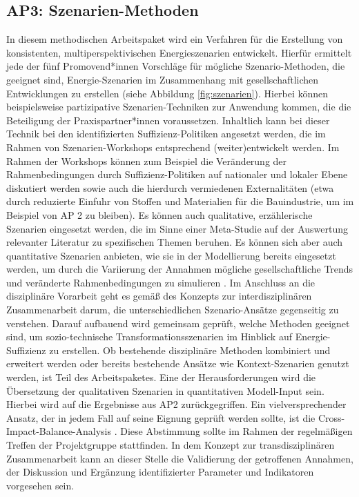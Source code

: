 \documentclass[a4paper,11pt,twoside]{scrartcl}
\begin{document}
\subsection*{AP3: Szenarien-Methoden}
In diesem methodischen Arbeitspaket wird ein Verfahren für die Erstellung von konsistenten, multiperspektivischen Energieszenarien entwickelt. Hierfür ermittelt jede der fünf Promovend*innen Vorschläge für mögliche Szenario-Methoden, die geeignet sind, Energie-Szenarien im Zusammenhang mit gesellschaftlichen Entwicklungen zu erstellen (siehe Abbildung \ref{fig:szenarien}). Hierbei können beispielsweise partizipative Szenarien-Techniken zur Anwendung kommen, die die Beteiligung der Praxispartner*innen voraussetzen. 
Inhaltlich kann bei dieser Technik bei den identifizierten Suffizienz-Politiken angesetzt werden, die im Rahmen von Szenarien-Workshops entsprechend (weiter)entwickelt werden. Im Rahmen der Workshops können zum Beispiel die Veränderung der Rahmenbedingungen durch Suffizienz-Politiken auf nationaler und lokaler Ebene diskutiert werden sowie auch die hierdurch vermiedenen Externalitäten (etwa durch reduzierte Einfuhr von Stoffen und Materialien für die Bauindustrie, um im Beispiel von AP 2 zu bleiben). Es können auch qualitative, erzählerische Szenarien eingesetzt werden, die im Sinne einer Meta-Studie auf der Auswertung relevanter Literatur zu spezifischen Themen beruhen. Es können sich aber auch quantitative Szenarien anbieten, wie sie in der Modellierung bereits eingesetzt werden, um  durch die Variierung der Annahmen mögliche gesellschaftliche Trends und veränderte Rahmenbedingungen zu simulieren \cite{Bierwirth2016}. 
Im Anschluss an die disziplinäre Vorarbeit geht es gemäß des Konzepts zur interdisziplinären Zusammenarbeit darum, die unterschiedlichen Szenario-Ansätze gegenseitig zu verstehen. Darauf aufbauend wird gemeinsam geprüft, welche Methoden geeignet sind, um sozio-technische Transformationsszenarien im Hinblick auf Energie-Suffizienz zu erstellen. Ob bestehende disziplinäre Methoden kombiniert und erweitert werden oder bereits bestehende Ansätze wie Kontext-Szenarien genutzt werden, ist Teil des Arbeitspaketes. Eine der Herausforderungen wird die Übersetzung der qualitativen Szenarien in quantitativen Modell-Input sein. Hierbei wird auf die Ergebnisse aus AP2 zurückgegriffen. Ein vielversprechender Ansatz, der in jedem Fall auf seine Eignung geprüft werden sollte, ist die Cross-Impact-Balance-Analysis \cite{WEIMERJEHLE2016}. Diese Abstimmung sollte im Rahmen der regelmäßigen Treffen der Projektgruppe stattfinden.
In dem Konzept zur transdisziplinären Zusammenarbeit kann an dieser Stelle die Validierung der getroffenen Annahmen, der Diskussion und Ergänzung identifizierter Parameter und Indikatoren vorgesehen sein.
\end{document}
